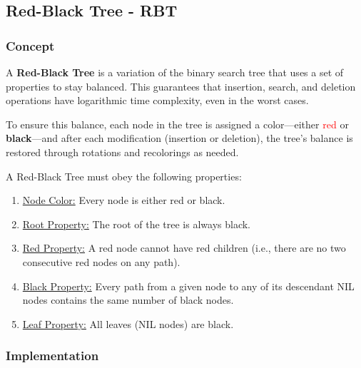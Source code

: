 \subsection{Red-Black Tree - RBT}

\subsubsection{Concept}

A \textbf{Red-Black Tree} is a variation of the binary search tree that uses a set of properties to stay balanced. This guarantees that insertion, search, and deletion operations have logarithmic time complexity, even in the worst cases.

To ensure this balance, each node in the tree is assigned a color---either \textcolor{red}{red} or \textbf{black}---and after each modification (insertion or deletion), the tree's balance is restored through rotations and recolorings as needed.

A Red-Black Tree must obey the following properties:
\begin{enumerate}
    \item \underline{Node Color:} Every node is either red or black.
    \item \underline{Root Property:} The root of the tree is always black.
    \item \underline{Red Property:} A red node cannot have red children (i.e., there are no two consecutive red nodes on any path).
    \item \underline{Black Property:} Every path from a given node to any of its descendant NIL nodes contains the same number of black nodes.
    \item \underline{Leaf Property:} All leaves (NIL nodes) are black.
\end{enumerate}

\subsubsection{Implementation}

